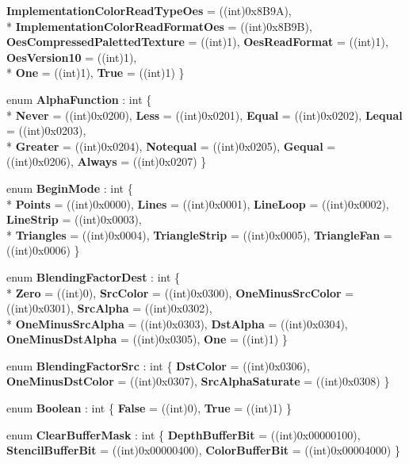 \begin{DoxyCompactItemize}
{\bfseries Implementation\-Color\-Read\-Type\-Oes} = ((int)0x8\-B9\-A), 
\\*
{\bfseries Implementation\-Color\-Read\-Format\-Oes} = ((int)0x8\-B9\-B), 
{\bfseries Oes\-Compressed\-Paletted\-Texture} = ((int)1), 
{\bfseries Oes\-Read\-Format} = ((int)1), 
{\bfseries Oes\-Version10} = ((int)1), 
\\*
{\bfseries One} = ((int)1), 
{\bfseries True} = ((int)1)
 \}
\item 
enum {\bfseries Alpha\-Function} \-: int \{ \\*
{\bfseries Never} = ((int)0x0200), 
{\bfseries Less} = ((int)0x0201), 
{\bfseries Equal} = ((int)0x0202), 
{\bfseries Lequal} = ((int)0x0203), 
\\*
{\bfseries Greater} = ((int)0x0204), 
{\bfseries Notequal} = ((int)0x0205), 
{\bfseries Gequal} = ((int)0x0206), 
{\bfseries Always} = ((int)0x0207)
 \}
\item 
enum {\bfseries Begin\-Mode} \-: int \{ \\*
{\bfseries Points} = ((int)0x0000), 
{\bfseries Lines} = ((int)0x0001), 
{\bfseries Line\-Loop} = ((int)0x0002), 
{\bfseries Line\-Strip} = ((int)0x0003), 
\\*
{\bfseries Triangles} = ((int)0x0004), 
{\bfseries Triangle\-Strip} = ((int)0x0005), 
{\bfseries Triangle\-Fan} = ((int)0x0006)
 \}
\item 
enum {\bfseries Blending\-Factor\-Dest} \-: int \{ \\*
{\bfseries Zero} = ((int)0), 
{\bfseries Src\-Color} = ((int)0x0300), 
{\bfseries One\-Minus\-Src\-Color} = ((int)0x0301), 
{\bfseries Src\-Alpha} = ((int)0x0302), 
\\*
{\bfseries One\-Minus\-Src\-Alpha} = ((int)0x0303), 
{\bfseries Dst\-Alpha} = ((int)0x0304), 
{\bfseries One\-Minus\-Dst\-Alpha} = ((int)0x0305), 
{\bfseries One} = ((int)1)
 \}
\item 
enum {\bfseries Blending\-Factor\-Src} \-: int \{ {\bfseries Dst\-Color} = ((int)0x0306), 
{\bfseries One\-Minus\-Dst\-Color} = ((int)0x0307), 
{\bfseries Src\-Alpha\-Saturate} = ((int)0x0308)
 \}
\item 
enum {\bfseries Boolean} \-: int \{ {\bfseries False} = ((int)0), 
{\bfseries True} = ((int)1)
 \}
\item 
enum {\bfseries Clear\-Buffer\-Mask} \-: int \{ {\bfseries Depth\-Buffer\-Bit} = ((int)0x00000100), 
{\bfseries Stencil\-Buffer\-Bit} = ((int)0x00000400), 
{\bfseries Color\-Buffer\-Bit} = ((int)0x00004000)
 \}
\item 

\end{DoxyCompactItemize}
